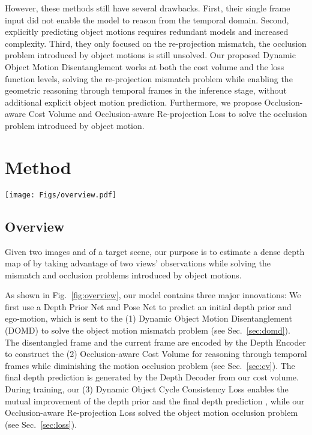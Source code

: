 \documentclass[runningheads]{llncs}
\begin{document}
However, these methods still have several drawbacks. First, their single frame input did not enable the model to reason from the temporal domain. Second, explicitly predicting object motions requires redundant models and increased complexity. Third, they only focused on the re-projection mismatch, the occlusion problem introduced by object motions is still unsolved. Our proposed Dynamic Object Motion Disentanglement works at both the cost volume and the loss function levels, solving the re-projection mismatch problem while enabling the geometric reasoning through temporal frames in the inference stage, without additional explicit object motion prediction. Furthermore, we propose Occlusion-aware Cost Volume and Occlusion-aware Re-projection Loss to solve the occlusion problem introduced by object motion.

\section{Method}


\begin{figure*}[t]
\centering
\texttt{[image: Figs/overview.pdf]}
\caption{ \textbf{DynamicDepth Architecture:} The inputs are images  and , from which dynamic-object-disentangled frame  is generated by the DOMD module for the final depth prediction . The occlusion-aware cost volume is constructed to facilitate geometric reasoning and the Dynamic Object Cycle Consistency Loss is devised for mutual reinforcement between  and . Green arrows indicates knowledge flow.}

\label{fig:overview}
\end{figure*}

\subsection{Overview}

Given two images  and  of a target scene, our purpose is to estimate a dense depth map  of  by taking advantage of two views' observations while solving the mismatch and occlusion problems introduced by object motions.

As shown in Fig.~\ref{fig:overview}, our model contains three major innovations: We first use a Depth Prior Net  and Pose Net  to predict an initial depth prior  and ego-motion, which is sent to the (1) Dynamic Object Motion Disentanglement (DOMD) to solve the object motion mismatch problem (see Sec.~\ref{sec:domd}). The disentangled frame  and the current frame  are encoded by the Depth Encoder to construct the (2) Occlusion-aware Cost Volume for reasoning through temporal frames while diminishing the motion occlusion problem (see Sec.~\ref{sec:cv}). The final depth prediction  is generated by the Depth Decoder from our cost volume. During training, our (3) Dynamic Object Cycle Consistency Loss  enables the mutual improvement of the depth prior  and the final depth prediction , while our Occlusion-aware Re-projection Loss  solved the object motion occlusion problem (see Sec.~\ref{sec:loss}).
\end{document}
